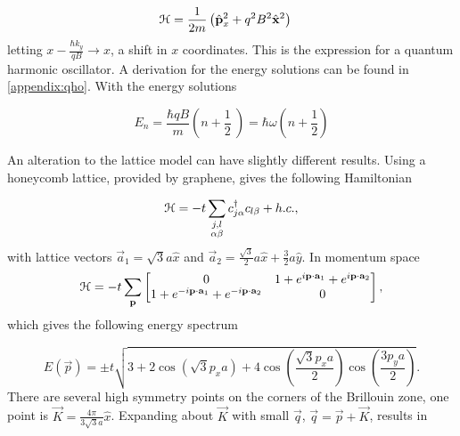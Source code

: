 \begin{align}
  \ham & = \dfrac{1}{2m} \left( \op{p}_x^2 + q^2 B^2 \op{x}^2 \right)
\end{align}
letting $x - \tfrac{\hbar k_y}{qB} \rightarrow x$, a shift in $x$ coordinates.
This is the expression for a quantum harmonic oscillator.
A derivation for the energy solutions can be found in \ref{appendix:qho}.
With the energy solutions

\begin{equation}
  E_n = \dfrac{\hbar q B}{m} \left(n+\dfrac{1}{2}\ \right) = \hbar \omega \left(n + \dfrac{1}{2} \right)
\end{equation}

An alteration to the lattice model can have slightly different results.
Using a honeycomb lattice, provided by graphene, gives the following Hamiltonian

\begin{equation}
  \mathcal{H} = -t \sum_{\substack{j, l \\ \alpha \beta}} c^{\dagger}_{j\alpha} c_{l\beta} + h.c.,
\end{equation}
with lattice vectors $\vec{a}_1 = \sqrt{3} a \hat{x}$ and $\vec{a}_2 = \tfrac{\sqrt{3}}{2} a \hat{x} + \tfrac{3}{2} a \hat{y}$.
In momentum space
\[
  \mathcal{H} = -t \sum_{\mathbf{p}}
  \begin{bmatrix}
    0 & 1 + e^{i\mathbf{p}\cdot \mathbf{a}_1 } + e^{i \mathbf{p}\cdot \mathbf{a}_2} \\
    1 + e^{-i\mathbf{p}\cdot \mathbf{a}_1 } + e^{-i \mathbf{p}\cdot \mathbf{a}_2} & 0
  \end{bmatrix},
\]
%
which gives the following energy spectrum

\begin{equation}
  E(\vec{p}) = \pm t \sqrt{3 + 2\cos{\left(\sqrt{3}p_x a\right)} + 4\cos{\left(\dfrac{\sqrt{3}p_x a}{2}\right)}\cos{\left(\dfrac{3p_y a}{2}\right)} }.
\end{equation}
There are several high symmetry points on the corners of the Brillouin zone, one point is $\vec{K} = \tfrac{4\pi}{3\sqrt{3}a} \hat{x}$.
Expanding about $\vec{K}$ with small $\vec{q}$, $\vec{q} = \vec{p} + \vec{K}$, results in

